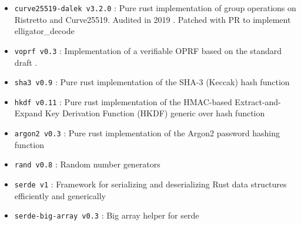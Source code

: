 \documentclass[../report.tex]{subfiles}
\begin{document}
\begin{itemize}
 \item \verb|curve25519-dalek v3.2.0| : Pure rust implementation of group operations on Ristretto and Curve25519. Audited in 2019 \cite{https://blog.quarkslab.com/security-audit-of-dalek-libraries.html}. Patched with PR \cite{https://github.com/dalek-cryptography/curve25519-dalek/pull/357} to implement elligator\_decode
 \item \verb|voprf v0.3| : Implementation of a verifiable OPRF based on the standard draft \cite{VOPRF_Standard_Draft}.
 \item \verb|sha3 v0.9| : Pure rust implementation of the SHA-3 (Keccak) hash function
 \item \verb|hkdf v0.11| : Pure rust implementation of the HMAC-based Extract-and-Expand Key Derivation Function (HKDF) generic over hash function
 \item \verb|argon2 v0.3| : Pure rust implementation of the Argon2 password hashing function
\item \verb|rand v0.8| : Random number generators
 \item \verb|serde v1| : Framework for serializing and deserializing Rust data structures efficiently and generically
 \item \verb|serde-big-array v0.3| : Big array helper for serde
\end{itemize}




\end{document}
